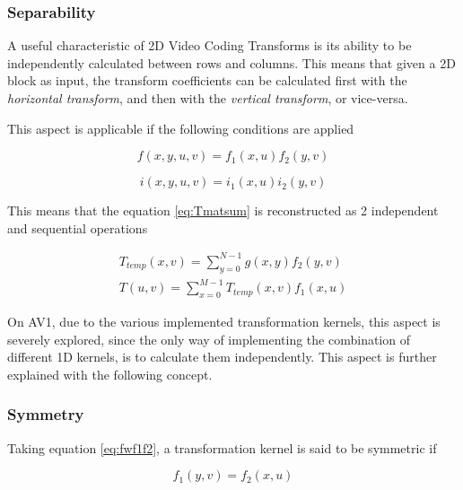 
\subsubsection{Separability}

A useful characteristic of 2D Video Coding Transforms is its ability to be independently calculated between rows and columns. This means that given a 2D block as input, the transform coefficients can be calculated first with the \emph{horizontal transform}, and then with the \emph{vertical transform}, or vice-versa.

This aspect is applicable if the following conditions are applied

\begin{equation} \label{eq:fwf1f2}
    f(x,y,u,v)=f_1(x,u)f_2(y,v)
\end{equation}


\begin{equation} \label{eq:ini1i2}
    i(x,y,u,v)=i_1(x,u)i_2(y,v)
\end{equation}

This means that the equation \ref{eq:Tmatsum} is reconstructed as 2 independent and sequential operations

\begin{gather}
    T_{temp}(x,v) = \sum_{y=0}^{N-1}g(x,y)f_2(y,v) \\
    T(u,v) = \sum_{x=0}^{M-1}T_{temp}(x,v)f_1(x,u)
\end{gather}

On AV1, due to the various implemented transformation kernels, this aspect is severely explored, since the only way of implementing the combination of different 1D kernels, is to calculate them independently. This aspect is further explained with the following concept.

\subsubsection{Symmetry}

Taking equation \ref{eq:fwf1f2}, a transformation kernel is said to be symmetric if 

\begin{equation}
    f_1(y,v) = f_2(x,u)
\end{equation}

